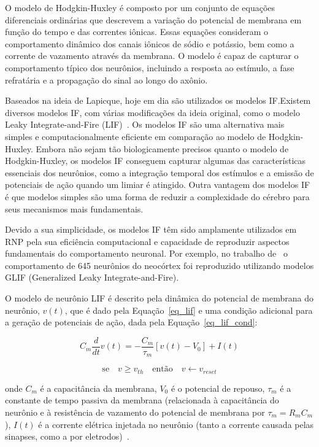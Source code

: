 O modelo de Hodgkin-Huxley é composto por um conjunto de equações diferenciais ordinárias que descrevem a variação do potencial de
membrana em função do tempo e das correntes iônicas. Essas equações consideram o comportamento dinâmico dos canais iônicos de
sódio e potássio, bem como a corrente de vazamento através da membrana. O modelo é capaz de capturar o comportamento típico dos
neurônios, incluindo a resposta ao estímulo, a fase refratária e a propagação do sinal ao longo do axônio.

Baseados na ideia de Lapicque, hoje em dia são utilizados os modelos IF.\@ Existem diversos modelos IF, com
várias modificações da ideia original, como o modelo Leaky Integrate-and-Fire (LIF)~\cite{burkittReview2006}. Os modelos IF são
uma alternativa mais simples e computacionalmente eficiente em comparação ao modelo de Hodgkin-Huxley. Embora não sejam tão
biologicamente precisos quanto o modelo de Hodgkin-Huxley, os modelos IF conseguem capturar algumas das características essenciais
dos neurônios, como a integração temporal dos estímulos e a emissão de potenciais de ação quando um limiar é atingido. Outra
vantagem dos modelos IF é que modelos simples são uma forma de reduzir a complexidade do cérebro para seus mecanismos mais
fundamentais.

Devido a sua simplicidade, os modelos IF têm sido amplamente utilizados em RNP pela sua eficiência computacional e capacidade de
reproduzir aspectos fundamentais do comportamento neuronal. Por exemplo, no trabalho de~ o
comportamento de 645 neurônios do neocórtex foi reproduzido utilizando modelos GLIF (Generalized Leaky Integrate-and-Fire). 

O modelo de neurônio LIF é descrito pela dinâmica do potencial de membrana do neurônio, $v(t)$, que é dado pela
Equação~\ref{eq_lif} e uma condição adicional para a geração de potenciais de ação, dada pela Equação~\ref{eq_lif_cond}:

\begin{equation}
\label{eq_lif}
C_m \frac{d}{dt}v(t) = -\frac{C_m}{\tau_m} [v(t) - V_0] + I(t)
\end{equation}

\begin{equation}
\label{eq_lif_cond}
\text{se}\quad v \ge v_{th} \quad \text{então} \quad v \gets v_{reset}
\end{equation}

\noindent{}onde $C_m$ é a capacitância da membrana, $V_0$ é o potencial de repouso, $\tau_m$ é a constante de tempo passiva da membrana
(relacionada à capacitância do neurônio e à resistência de vazamento do potencial de membrana por $\tau_m = R_m C_m$), $I(t)$ é a
corrente elétrica injetada no neurônio (tanto a corrente causada pelas sinapses, como a por eletrodos)~\cite{burkittReview2006}. 

